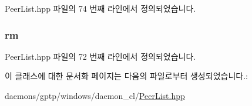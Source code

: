 Peer\+List.\+hpp 파일의 74 번째 라인에서 정의되었습니다.

\subsubsection[{\texorpdfstring{rm}{rm}}]{ rm\hspace{0.3cm}{\ttfamily [private]}}\hypertarget{class_peer_list_a9958b92a85d1751a7bdfac8c5fd4ea96}{}\label{class_peer_list_a9958b92a85d1751a7bdfac8c5fd4ea96}


Peer\+List.\+hpp 파일의 72 번째 라인에서 정의되었습니다.



이 클래스에 대한 문서화 페이지는 다음의 파일로부터 생성되었습니다.\+:\begin{DoxyCompactItemize}
\item 
daemons/gptp/windows/daemon\+\_\+cl/\hyperlink{_peer_list_8hpp}{Peer\+List.\+hpp}\end{DoxyCompactItemize}

